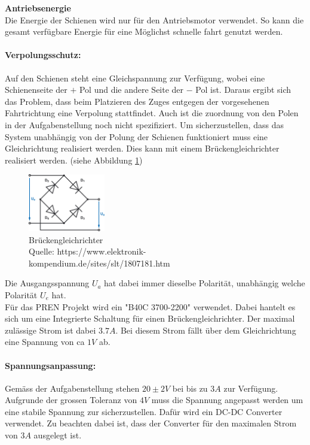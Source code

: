 \documentclass[../../main.tex]{subfiles}
\begin{document}
    \textbf{Antriebsenergie}\\
    Die Energie der Schienen wird nur für den Antriebsmotor verwendet. So kann die gesamt verfügbare Energie für eine Möglichst schnelle fahrt genutzt werden. 
    \paragraph{Verpolungsschutz:}
    Auf den Schienen steht eine Gleichspannung zur Verfügung, wobei eine Schienenseite der $+$ Pol und die andere Seite der $-$ Pol ist. Daraus ergibt sich das Problem, dass beim Platzieren des Zuges entgegen der vorgesehenen Fahrtrichtung eine Verpolung stattfindet. Auch ist die zuordnung von den Polen in der Aufgabenstellung noch nicht spezifiziert. Um sicherzustellen, dass das System unabhängig von der Polung der Schienen funktioniert muss eine Gleichrichtung realisiert werden. Dies kann mit einem Brückengleichrichter realisiert werden. (siehe Abbildung \ref{fig:et_bruckengleichrichter})

    \begin{figure}[H]
        \centering
        \includegraphics[width=0.3\textwidth]{Brueckengleichrichter.png}
        \caption {Brückengleichrichter \\Quelle: https://www.elektronik-kompendium.de/sites/slt/1807181.htm}
        \label{fig:et_bruckengleichrichter}
    \end{figure}

    Die Ausgangsspannung $U_a$ hat dabei immer dieselbe Polarität, unabhängig welche Polarität $U_e$ hat. \\
    Für das PREN Projekt wird ein "B40C 3700-2200"  verwendet. Dabei hantelt es sich um eine Integrierte Schaltung für einen Brückengleichrichter. Der maximal zulässige Strom ist dabei $3.7A$. Bei diesem Strom fällt über dem Gleichrichtung eine Spannung von ca $1V$ ab.
    \paragraph{Spannungsanpassung:}Gemäss der Aufgabenstellung stehen $20\pm2V$ bei bis zu $3A$ zur Verfügung. Aufgrunde der grossen Toleranz von $4V$ muss die Spannung angepasst werden um eine stabile Spannung zur sicherzustellen. Dafür wird ein DC-DC Converter verwendet. Zu beachten dabei ist, dass der Converter für den maximalen Strom von $3A$ ausgelegt ist.
\end{document}
